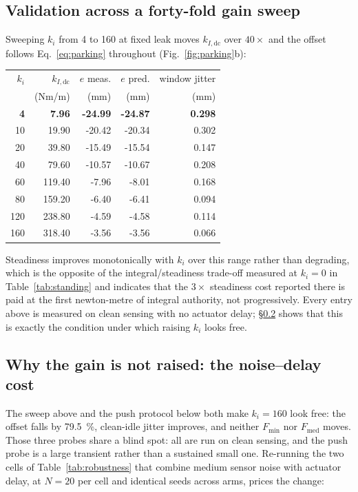 \documentclass[conference]{IEEEtran}
\begin{document}
\subsection{Validation across a forty-fold gain sweep}

Sweeping $k_i$ from \num{4} to \num{160} at fixed leak moves $k_{I,\text{dc}}$
over $40{\times}$ and the offset follows Eq.~\eqref{eq:parking} throughout
(Fig.~\ref{fig:parking}b):

\begin{center}\footnotesize
\begin{tabular}{rrrrr}
\hline
$k_i$ & $k_{I,\text{dc}}$ & $e$ meas. & $e$ pred. & window jitter \\
 & (Nm/m) & (mm) & (mm) & (mm) \\
\hline
\textbf{4} & \textbf{7.96} & \textbf{-24.99} & \textbf{-24.87} & \textbf{0.298} \\
10 & 19.90 & -20.42 & -20.34 & 0.302 \\
20 & 39.80 & -15.49 & -15.54 & 0.147 \\
40 & 79.60 & -10.57 & -10.67 & 0.208 \\
60 & 119.40 & -7.96 & -8.01 & 0.168 \\
80 & 159.20 & -6.40 & -6.41 & 0.094 \\
120 & 238.80 & -4.59 & -4.58 & 0.114 \\
160 & 318.40 & -3.56 & -3.56 & 0.066 \\
\hline
\end{tabular}
\end{center}

Steadiness improves monotonically with $k_i$ over this range rather than
degrading, which is the opposite of the integral/steadiness trade-off measured
at $k_i{=}0$ in Table~\ref{tab:standing} and indicates that the $3{\times}$
steadiness cost reported there is paid at the first newton-metre of integral
authority, not progressively. Every entry above is measured on clean sensing
with no actuator delay; \S\ref{sec:parking_ki_cost} shows that this is exactly
the condition under which raising $k_i$ looks free.

\subsection{Why the gain is not raised: the noise--delay cost}
\label{sec:parking_ki_cost}

The sweep above and the push protocol below both make $k_i{=}160$ look free:
the offset falls by \SI{79.5}{\percent}, clean-idle jitter improves, and
neither $F_{\min}$ nor $F_{\text{med}}$ moves. Those three probes share a blind spot: all are run on clean sensing, and the push probe is a large
transient rather than a sustained small one. Re-running the two cells of
Table~\ref{tab:robustness} that combine medium sensor noise with actuator
delay, at $N{=}20$ per cell and identical seeds across arms, prices the change:
\end{document}
